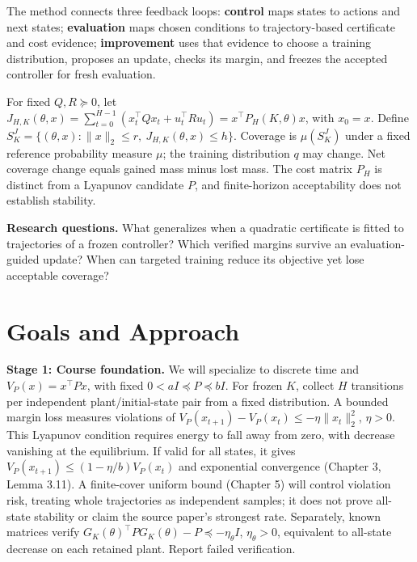 \documentclass{l4dc2026}
\begin{document}
The method connects three feedback loops: \textbf{control} maps states to
actions and next states; \textbf{evaluation} maps chosen conditions to
trajectory-based certificate and cost evidence; \textbf{improvement} uses that
evidence to choose a training distribution, proposes an update, checks its
margin, and freezes the accepted controller for fresh evaluation.

For fixed $Q,R\succeq0$, let
$J_{H,K}(\theta,x)=\sum_{t=0}^{H-1}(x_t^\top Qx_t+u_t^\top Ru_t)
=x^\top P_H(K,\theta)x$, with $x_0=x$.
Define $S_K^J=\{(\theta,x):\|x\|_2\le r,\ J_{H,K}(\theta,x)\le h\}$.
Coverage is $\mu(S_K^J)$ under a fixed reference probability measure $\mu$;
the training distribution $q$ may change. Net coverage change equals gained
mass minus lost mass. The cost matrix $P_H$ is distinct from a Lyapunov
candidate $P$, and finite-horizon acceptability does not establish stability.

\textbf{Research questions.}
What generalizes when a quadratic certificate is fitted to trajectories of a
frozen controller? Which verified margins survive an evaluation-guided update?
When can targeted training reduce its objective yet lose acceptable coverage?

\section{Goals and Approach}

\textbf{Stage 1: Course foundation.}
We will specialize \citet{boffi2021learning} to discrete time and
$V_P(x)=x^\top Px$, with fixed $0<aI\preceq P\preceq bI$.
For frozen $K$, collect $H$ transitions per independent plant/initial-state
pair from a fixed distribution. A bounded margin loss measures violations of
$V_P(x_{t+1})-V_P(x_t)\le-\eta\|x_t\|_2^2$, $\eta>0$.
This Lyapunov condition requires energy to fall away from zero, with decrease
vanishing at the equilibrium. If valid for all states, it gives
$V_P(x_{t+1})\le(1-\eta/b)V_P(x_t)$ and exponential convergence
(Chapter 3, Lemma 3.11).
A finite-cover uniform bound (Chapter 5) will control violation risk, treating
whole trajectories as independent samples; it does not prove all-state stability
or claim the source paper's strongest rate. Separately, known matrices verify
$G_K(\theta)^\top PG_K(\theta)-P\preceq-\eta_\theta I$, $\eta_\theta>0$,
equivalent to all-state decrease on each retained plant. Report failed verification.
\end{document}
